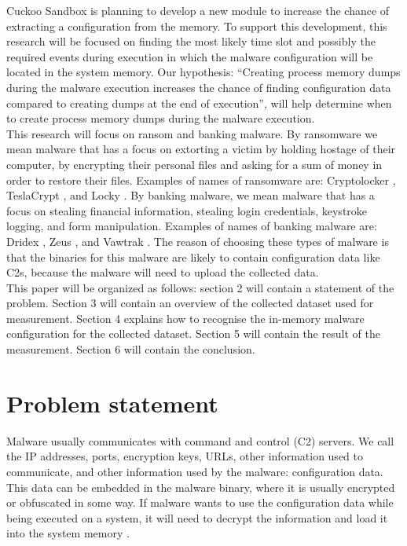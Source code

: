 \documentclass[conference]{IEEEtran}
\begin{document}
Cuckoo Sandbox is planning to develop a new module to increase the chance of extracting a configuration from the memory. To support this development, this research will be focused on finding the most likely time slot and  possibly  the required events during execution in which the malware configuration will be located in the system memory. 
Our hypothesis: “Creating process memory dumps during the malware execution increases the chance of finding configuration data compared to creating dumps at the end of execution”, will help determine when to create process memory dumps during the malware execution.\\

This research will focus on ransom and banking malware. By ransomware we mean malware that has a focus on extorting a victim by holding hostage of their computer, by encrypting their personal files and asking for a sum of money in order to restore their files. Examples of names of ransomware are: Cryptolocker \cite{tran-cryptolocker}, TeslaCrypt \cite{wyke-currans}, and Locky \cite{long-locky}.
By banking malware, we mean malware that has a focus on stealing financial information, stealing login credentials, keystroke logging, and form manipulation. Examples of names of banking malware are: Dridex \cite{brien-dridex}, Zeus \cite{wyke-zeus}, and Vawtrak \cite{kroustek-vawtrak}. The reason of choosing these types of malware is that the binaries  for this malware are likely to contain configuration data like C2s, because the malware will need to upload the collected data.\\

This paper will be organized as follows:  section 2 will contain a statement of the problem. Section 3 will contain an overview of the collected dataset  used for measurement. Section 4 explains how to recognise the in-memory malware configuration for the collected dataset. Section 5 will contain the result of the measurement. Section 6 will contain the conclusion.\\


\section{Problem statement}

Malware usually communicates with command and control (C2) servers. We call the IP addresses, ports, encryption keys, URLs,   other information used to communicate, and other information used by the malware: configuration data. This data can be embedded in the malware binary, where it is usually encrypted or obfuscated in some way. If malware wants to use the configuration data while being executed on a system, it will need to decrypt the information and load it into the system memory \cite{wyke-confextract}.\\
\end{document}
